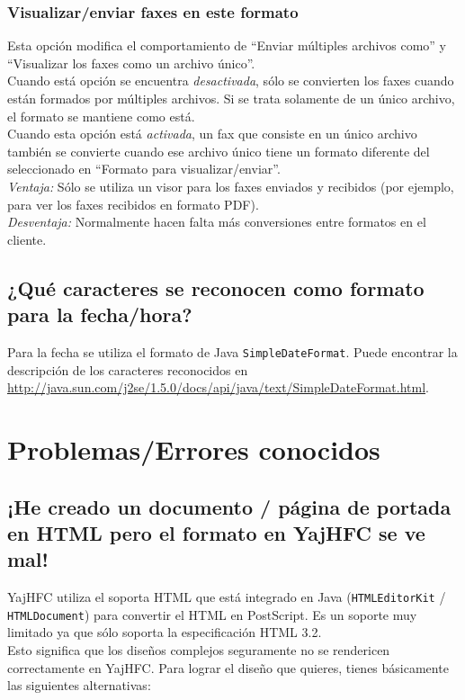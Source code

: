 \documentclass[a4paper,10pt]{scrartcl}
\begin{document}
\subsubsection{Visualizar/enviar faxes en este formato}
Esta opción modifica el comportamiento de ``Enviar múltiples archivos como'' y ``Visualizar los faxes como un archivo único''.\\
Cuando está opción se encuentra \textit{desactivada}, sólo se convierten los faxes cuando están formados por múltiples archivos. Si se trata solamente de un único archivo, el formato se mantiene como está.\\
Cuando esta opción está \textit{activada}, un fax que consiste en un único archivo también se convierte cuando ese archivo único tiene un formato diferente del seleccionado en ``Formato para visualizar/enviar''.\\
\textit{Ventaja:} Sólo se utiliza un visor para los faxes enviados y recibidos (por ejemplo, para ver los faxes recibidos en formato PDF).\\
\textit{Desventaja:} Normalmente hacen falta más conversiones entre formatos en el cliente.

\subsection{¿Qué caracteres se reconocen como formato para la fecha/hora?}

Para la fecha se utiliza el formato de Java \texttt{SimpleDateFormat}. Puede encontrar la descripción de los caracteres reconocidos en \url{http://java.sun.com/j2se/1.5.0/docs/api/java/text/SimpleDateFormat.html}.

\section{Problemas/Errores conocidos}

\subsection{¡He creado un documento / página de portada en HTML pero el formato en YajHFC se ve mal!}

YajHFC utiliza el soporta HTML que está integrado en Java (\texttt{HTMLEditorKit} / \texttt{HTMLDocument}) para convertir el HTML en PostScript. Es un soporte muy limitado ya que sólo soporta la especificación HTML 3.2.\\
Esto significa que los diseños complejos seguramente no se rendericen correctamente en YajHFC.
Para lograr el diseño que quieres, tienes básicamente las siguientes alternativas:
\end{document}
